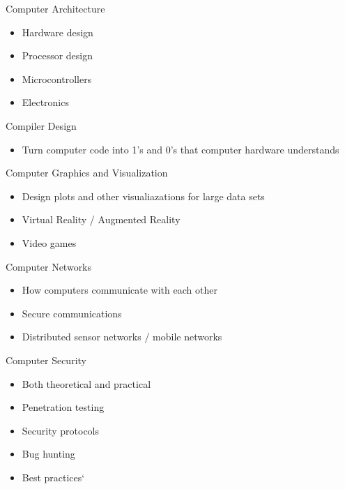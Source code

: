 \documentclass{beamer}
\begin{document}
\begin{frame}{Computer Architecture}
\begin{itemize}
	\item Hardware design
	\item Processor design
	\item Microcontrollers
	\item Electronics
\end{itemize}
\end{frame}

\begin{frame}{Compiler Design}
\begin{itemize}
	\item Turn computer code into 1's and 0's that computer hardware understands
\end{itemize}
\end{frame}

\begin{frame}{Computer Graphics and Visualization}
\begin{itemize}
	\item Design plots and other visualiazations for large data sets
	\item Virtual Reality / Augmented Reality
	\item Video games
\end{itemize}
\end{frame}

\begin{frame}{Computer Networks}
\begin{itemize}
	\item How computers communicate with each other
	\item Secure communications
	\item Distributed sensor networks / mobile networks
\end{itemize}
\end{frame}

\begin{frame}{Computer Security}
	\begin{itemize}
		\item Both theoretical and practical
		\item Penetration testing
		\item Security protocols
		\item Bug hunting
		\item Best practices`
	\end{itemize}
\end{frame}
\end{document}
